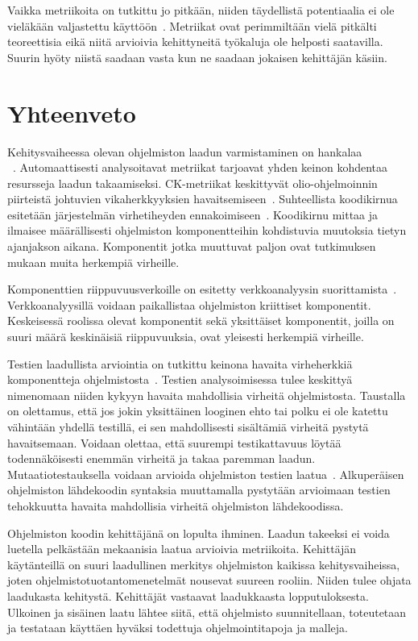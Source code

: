 \documentclass[finnish]{../tktltiki2}
\theoremstyle{definition}
\theoremstyle{remark}
\begin{document}
    Vaikka metriikoita on tutkittu jo pitkään, niiden täydellistä potentiaalia ei ole vieläkään valjastettu 
käyttöön~\cite{YH11}. Metriikat ovat perimmiltään vielä pitkälti teoreettisia eikä niitä arvioivia kehittyneitä 
työkaluja ole helposti saatavilla. Suurin hyöty niistä saadaan vasta kun ne saadaan jokaisen kehittäjän käsiin.

\section{Yhteenveto}

Kehitysvaiheessa olevan ohjelmiston laadun varmistaminen on hankalaa\\~\cite{BBM96, NB05, NB07, ZN08, MNDT09}. 
Automaattisesti analysoitavat metriikat tarjoavat yhden keinon kohdentaa resursseja laadun takaamiseksi. CK-metriikat 
keskittyvät olio-ohjelmoinnin piirteistä johtuvien vikaherkkyyksien havaitsemiseen~\cite{CK94, BBM96}. Suhteellista 
koodikirnua esitetään järjestelmän virhetiheyden ennakoimiseen~\cite{NB05}. Koodikirnu mittaa ja ilmaisee määrällisesti 
ohjelmiston komponentteihin kohdistuvia muutoksia tietyn ajanjakson aikana. Komponentit jotka muuttuvat paljon ovat 
tutkimuksen mukaan muita herkempiä virheille.

    Komponenttien riippuvuusverkoille on esitetty verkkoanalyysin suorittamista~\cite{ZN08}. Verkkoanalyysillä voidaan 
paikallistaa ohjelmiston kriittiset komponentit. Keskeisessä roolissa olevat komponentit sekä yksittäiset komponentit, 
joilla on suuri määrä keskinäisiä riippuvuuksia, ovat yleisesti herkempiä virheille.

    Testien laadullista arviointia on tutkittu keinona havaita virheherkkiä komponentteja ohjelmistosta~\cite{MNDT09}. 
Testien analysoimisessa tulee keskittyä nimenomaan niiden kykyyn havaita mahdollisia virheitä ohjelmistosta. Taustalla 
on olettamus, että jos jokin yksittäinen looginen ehto tai polku ei ole katettu vähintään yhdellä testillä, ei sen 
mahdollisesti sisältämiä virheitä pystytä havaitsemaan. Voidaan olettaa, että suurempi testikattavuus löytää 
todennäköisesti enemmän virheitä ja takaa paremman laadun. Mutaatiotestauksella voidaan arvioida ohjelmiston 
testien laatua~\cite{YH11}. Alkuperäisen ohjelmiston lähdekoodin syntaksia muuttamalla pystytään arvioimaan testien 
tehokkuutta havaita mahdollisia virheitä ohjelmiston lähdekoodissa.

    Ohjelmiston koodin kehittäjänä on lopulta ihminen. Laadun takeeksi ei voida luetella pelkästään mekaanisia 
laatua arvioivia metriikoita. Kehittäjän käytänteillä on suuri laadullinen merkitys ohjelmiston kaikissa 
kehitysvaiheissa, joten ohjelmistotuotantomenetelmät nousevat suureen rooliin. Niiden tulee ohjata laadukasta kehitystä. 
Kehittäjät vastaavat laadukkaasta lopputuloksesta. Ulkoinen ja sisäinen laatu lähtee siitä, että ohjelmisto 
suunnitellaan, toteutetaan ja testataan käyttäen hyväksi todettuja ohjelmointitapoja ja malleja.
\end{document}
